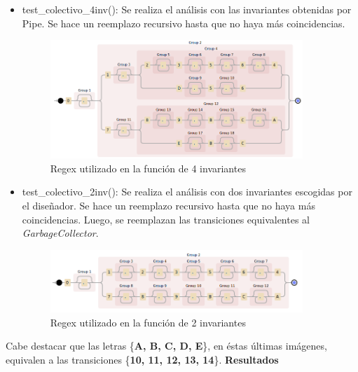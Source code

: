 \documentclass{article}
\begin{document}
    \begin{itemize}
        \item test\_colectivo\_4inv(): Se realiza el análisis con las invariantes obtenidas 
        por Pipe. Se hace un reemplazo recursivo hasta que no haya más coincidencias.
        \begin{figure}[H]
            \includegraphics[width=0.9\textwidth, center]{regex4inv.png}
            \caption{Regex utilizado en la función de 4 invariantes}
        \end{figure}
        \item test\_colectivo\_2inv(): Se realiza el análisis con dos invariantes escogidas 
        por el diseñador. Se hace un reemplazo recursivo hasta que no haya más coincidencias.
        Luego, se reemplazan las transiciones equivalentes al \emph{GarbageCollector}.
        \begin{figure}[H]
            \includegraphics[width=0.9\textwidth, center]{regex2inv.png}
            \caption{Regex utilizado en la función de 2 invariantes}
        \end{figure}
    \end{itemize} \par
    Cabe destacar que las letras \{\textbf{A, B, C, D, E}\}, en éstas últimas imágenes, 
    equivalen a las transiciones \{\textbf{10, 11, 12, 13, 14}\}. \newline \newline
    \textbf{Resultados}
\end{document}
